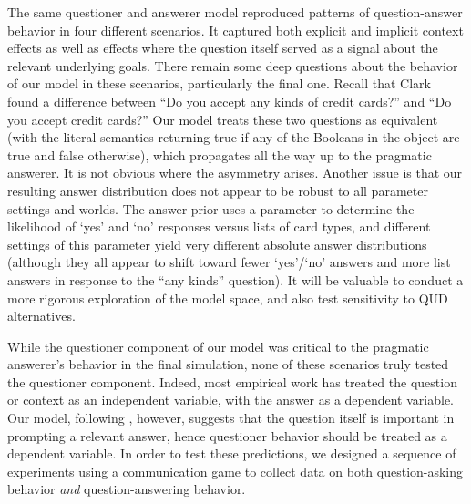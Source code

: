 \documentclass[12pt, floatsintext, jou]{apa6}
\begin{document}
The same questioner and answerer model reproduced patterns of question-answer behavior in four different scenarios. It captured both explicit and implicit context effects as well as effects where the question itself served as a signal about the relevant underlying goals. 
There remain some deep questions about the behavior of our model in these scenarios, particularly the final one. Recall that Clark found a difference between ``Do you accept any kinds of credit cards?'' and ``Do you accept credit cards?'' Our model treats these two questions as equivalent (with the literal semantics returning true if any of the Booleans in the object are true and false otherwise), which propagates all the way up to the pragmatic answerer. It is not obvious where the asymmetry arises.  Another issue is that our resulting answer distribution does not appear to be robust to all parameter settings and worlds. The answer prior uses a parameter to determine the likelihood of `yes' and `no' responses versus lists of card types, and different settings of this parameter yield very different absolute answer distributions (although they all appear to shift toward fewer `yes'/`no' answers and more list answers in response to the ``any kinds'' question). It will be valuable to conduct a more rigorous exploration of the model space, and also test sensitivity to QUD alternatives. 

While the questioner component of our model was critical to the pragmatic answerer's behavior in the final simulation, none of these scenarios truly tested the questioner component.  Indeed, most empirical work has treated the question or context as an independent variable, with the answer as a dependent variable. Our model, following , however, suggests that the question itself is important in prompting a relevant answer, hence questioner behavior should be treated as a dependent variable. In order to test these predictions, we designed a sequence of experiments using a communication game to collect data on both question-asking behavior \emph{and} question-answering behavior.
\end{document}
